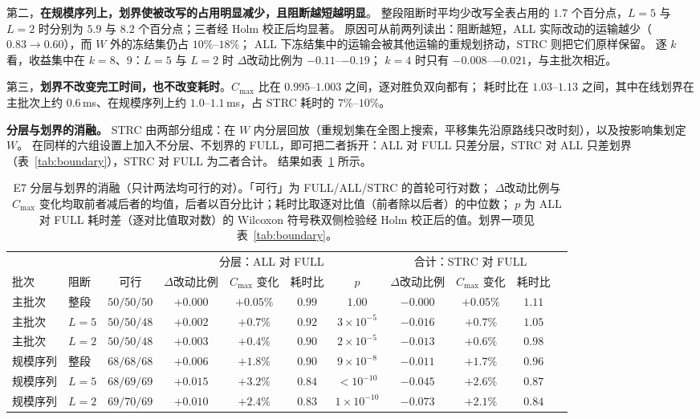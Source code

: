 \documentclass[manuscript,screen,review]{acmart}
\providecommand{\STRC}{\textsc{STRC}}
\begin{document}
第二，\textbf{在规模序列上，划界使被改写的占用明显减少，且阻断越短越明显}。
整段阻断时平均少改写全表占用的 \(1.7\) 个百分点，\(L=5\) 与 \(L=2\) 时分别为 \(5.9\) 与 \(8.2\) 个百分点；三者经 Holm 校正后均显著。
原因可从前两列读出：阻断越短，ALL 实际改动的运输越少（\(0.83\to0.60\)），而 \(W\) 外的冻结集仍占 \(10\%\)--\(18\%\)；
ALL 下冻结集中的运输会被其他运输的重规划挤动，\STRC{} 则把它们原样保留。
逐 \(k\) 看，收益集中在 \(k=8\)、\(9\)：\(L=5\) 与 \(L=2\) 时 \(\Delta\)改动比例为 \(-0.11\)--\(-0.19\)；
\(k=4\) 时只有 \(-0.008\)--\(-0.021\)，与主批次相近。

第三，\textbf{划界不改变完工时间，也不改变耗时}。\(C_{\max}\) 比在 \(0.995\)--\(1.003\) 之间，逐对胜负双向都有；
耗时比在 \(1.03\)--\(1.13\) 之间，其中在线划界在主批次上约 \(0.6\)\,ms、在规模序列上约 \(1.0\)--\(1.1\)\,ms，占 \STRC{} 耗时的 \(7\%\)--\(10\%\)。

\textbf{分层与划界的消融。}
\STRC{} 由两部分组成：在 \(W\) 内分层回放（重规划集在全图上搜索，平移集先沿原路线只改时刻），以及按影响集划定 \(W\)。
在同样的六组设置上加入不分层、不划界的 FULL，即可把二者拆开：ALL 对 FULL 只差分层，\STRC{} 对 ALL 只差划界（表~\ref{tab:boundary}），\STRC{} 对 FULL 为二者合计。
结果如表~\ref{tab:ablation} 所示。

\begin{table}[t]
\centering
\caption{E7 分层与划界的消融（只计两法均可行的对）。「可行」为 FULL/ALL/\STRC{} 的首轮可行对数；
\(\Delta\)改动比例与 \(C_{\max}\) 变化均取前者减后者的均值，后者以百分比计；耗时比取逐对比值（前者除以后者）的中位数；
\(p\) 为 ALL 对 FULL 耗时差（逐对比值取对数）的 Wilcoxon 符号秩双侧检验经 Holm 校正后的值。划界一项见表~\ref{tab:boundary}。}
\label{tab:ablation}
\small
\setlength{\tabcolsep}{3pt}
\begin{tabular}{@{}llccccccccc@{}}
\toprule
 & & & \multicolumn{4}{c}{分层：ALL 对 FULL} & \multicolumn{3}{c}{合计：\STRC{} 对 FULL} \\
\cmidrule(lr){4-7}\cmidrule(l){8-10}
批次 & 阻断 & 可行 & \(\Delta\)改动比例 & \(C_{\max}\) 变化 & 耗时比 & \(p\) & \(\Delta\)改动比例 & \(C_{\max}\) 变化 & 耗时比 \\
\midrule
主批次 & 整段 & \(50/50/50\) & \(+0.000\) & \(+0.05\%\) & \(0.99\) & \(1.00\) & \(-0.000\) & \(+0.05\%\) & \(1.11\) \\
主批次 & \(L=5\) & \(50/50/48\) & \(+0.002\) & \(+0.7\%\) & \(0.92\) & \(3\times10^{-5}\) & \(-0.016\) & \(+0.7\%\) & \(1.05\) \\
主批次 & \(L=2\) & \(50/50/48\) & \(+0.003\) & \(+0.4\%\) & \(0.90\) & \(2\times10^{-5}\) & \(-0.013\) & \(+0.6\%\) & \(0.98\) \\
\addlinespace[2pt]
规模序列 & 整段 & \(68/68/68\) & \(+0.006\) & \(+1.8\%\) & \(0.90\) & \(9\times10^{-8}\) & \(-0.011\) & \(+1.7\%\) & \(0.96\) \\
规模序列 & \(L=5\) & \(68/69/69\) & \(+0.015\) & \(+3.2\%\) & \(0.84\) & \(<10^{-10}\) & \(-0.045\) & \(+2.6\%\) & \(0.87\) \\
规模序列 & \(L=2\) & \(69/70/69\) & \(+0.010\) & \(+2.4\%\) & \(0.83\) & \(1\times10^{-10}\) & \(-0.073\) & \(+2.1\%\) & \(0.84\) \\
\bottomrule
\end{tabular}
\end{table}
\end{document}
